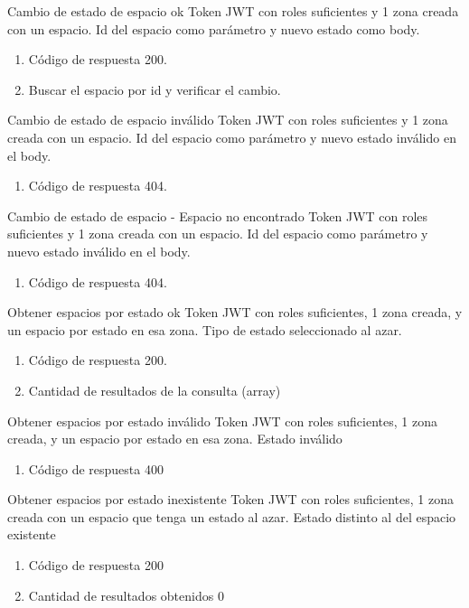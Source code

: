 {Cambio de estado de espacio ok}
{Token JWT con roles suficientes y 1 zona creada con un espacio.}
{Id del espacio como parámetro y nuevo estado como body.}
{\begin{enumerate} [leftmargin=*, nosep]
    \item Código de respuesta 200.
    \item Buscar el espacio por id y verificar el cambio.
\end{enumerate}}

{Cambio de estado de espacio inválido}
{Token JWT con roles suficientes y 1 zona creada con un espacio.}
{Id del espacio como parámetro y nuevo estado inválido en el body.}
{\begin{enumerate} [leftmargin=*, nosep]
    \item Código de respuesta 404.
\end{enumerate}}

{Cambio de estado de espacio - Espacio no encontrado}
{Token JWT con roles suficientes y 1 zona creada con un espacio.}
{Id del espacio como parámetro y nuevo estado inválido en el body.}
{\begin{enumerate} [leftmargin=*, nosep]
    \item Código de respuesta 404.
\end{enumerate}}

{Obtener espacios por estado ok}
{Token JWT con roles suficientes, 1 zona creada, y un espacio por estado en esa zona.}
{Tipo de estado seleccionado al azar.}
{\begin{enumerate} [leftmargin=*, nosep]
    \item Código de respuesta 200.
    \item Cantidad de resultados de la consulta (array)
\end{enumerate}}

{Obtener espacios por estado inválido}
{Token JWT con roles suficientes, 1 zona creada, y un espacio por estado en esa zona.}
{Estado inválido}
{\begin{enumerate} [leftmargin=*, nosep]
    \item Código de respuesta 400
\end{enumerate}}

{Obtener espacios por estado inexistente}
{Token JWT con roles suficientes, 1 zona creada con un espacio que tenga un estado al azar.}
{Estado distinto al del espacio existente}
{\begin{enumerate} [leftmargin=*, nosep]
    \item Código de respuesta 200
    \item Cantidad de resultados obtenidos 0
\end{enumerate}}


